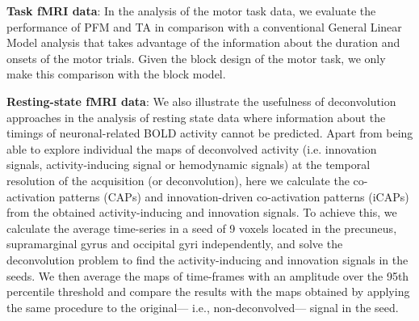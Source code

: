 \textbf{Task fMRI data}: In the analysis of the motor task data, we evaluate the performance of PFM and TA in comparison with a conventional General Linear Model analysis that takes advantage of the information about the duration and onsets of the motor trials. Given the block design of the motor task, we only make this comparison with the block model.

\textbf{Resting-state fMRI data}: We also illustrate the usefulness of deconvolution approaches in the analysis of resting state data where information about the timings of neuronal-related BOLD activity cannot be predicted. Apart from being able to explore individual the maps of deconvolved activity (i.e. innovation signals, activity-inducing signal or hemodynamic signals) at the temporal resolution of the acquisition (or deconvolution), here we calculate the co-activation patterns (CAPs) and innovation-driven co-activation patterns (iCAPs) from the obtained activity-inducing and innovation signals. To achieve this, we calculate the average time-series in a seed of 9 voxels located in the precuneus, supramarginal gyrus and occipital gyri independently, and solve the deconvolution problem to find the activity-inducing and innovation signals in the seeds. We then average the maps of time-frames with an amplitude over the 95th percentile threshold and compare the results with the maps obtained by applying the same procedure to the original--- i.e., non-deconvolved--- signal in the seed.
